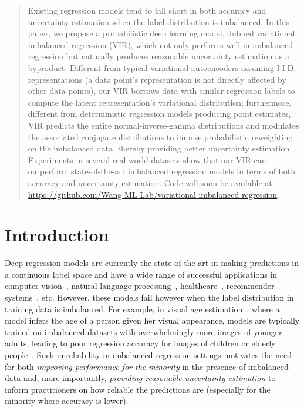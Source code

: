 \begin{abstract}
Existing regression models tend to fall short in both accuracy and uncertainty estimation when the label distribution is imbalanced. In this paper, we 
propose a probabilistic deep learning model, dubbed variational imbalanced regression (VIR), which not only performs well in imbalanced regression but naturally produces reasonable uncertainty estimation as a byproduct. 
Different from typical variational autoencoders assuming I.I.D. representations (a data point's representation is not directly affected by other data points), our VIR borrows data with similar regression labels to compute the latent representation's variational distribution; furthermore, different from deterministic regression models producing point estimates, VIR predicts the entire normal-inverse-gamma distributions and modulates the associated conjugate distributions to impose probabilistic reweighting on the imbalanced data, thereby providing better uncertainty estimation. Experiments in several real-world datasets show that our VIR can outperform state-of-the-art imbalanced regression models in terms of both accuracy and uncertainty estimation. Code will soon be available at \url{https://github.com/Wang-ML-Lab/variational-imbalanced-regression}.
\end{abstract}

\section{Introduction}\label{sec:intro}
Deep regression models are currently the state of the art in making predictions in a continuous label space and have a wide range of successful applications in computer vision~\citep{ExampleCV}, natural language processing~\citep{ExampleNLP}, healthcare~\citep{BIN,CounTS}, recommender systems~\citep{ExposureBias,REN}, etc. 
However, these models fail however when the label distribution in training data is imbalanced. For example, in visual age estimation~\citep{AGEDB}, where a model infers the age of a person given her visual appearance, models are typically trained on imbalanced datasets with overwhelmingly more images of younger adults, leading to poor regression accuracy for images of children or elderly people~\citep{MDLT,DIR}. 
Such unreliability in imbalanced regression settings motivates the need for both \emph{improving performance for the minority} in the presence of imbalanced data and, more importantly, \emph{providing reasonable uncertainty estimation} to inform practitioners on how reliable the predictions are (especially for the minority where accuracy is lower).

